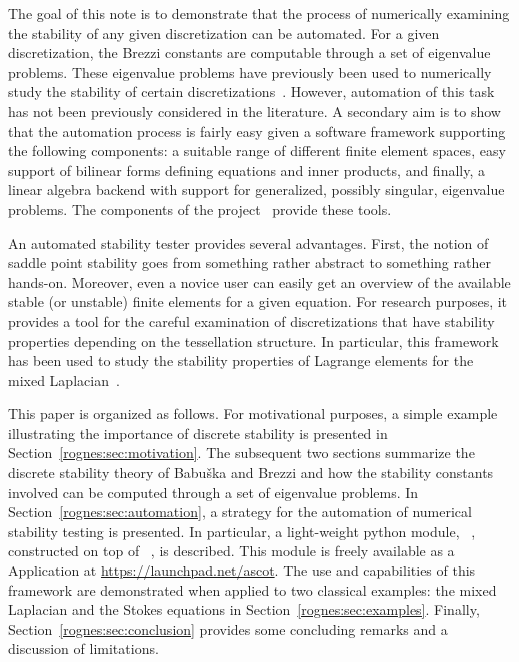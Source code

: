 The goal of this note is to demonstrate that the process of
numerically examining the stability of any given discretization can be
automated. For a given discretization, the Brezzi constants are
computable through a set of eigenvalue problems. These eigenvalue
problems have previously been used to numerically study the stability
of certain discretizations~\cite{ArnoldRognes2009, ChapelleBathe1993,
  Qin1994}. However, automation of this task has not been previously
considered in the literature. A secondary aim is to show that the
automation process is fairly easy given a software framework
supporting the following components: a suitable range of different
finite element spaces, easy support of bilinear forms defining
equations and inner products, and finally, a linear algebra backend
with support for generalized, possibly singular, eigenvalue
problems. The components of the \fenics{} project~\cite{www:fenics}
provide these tools.

An automated stability tester provides several advantages. First, the
notion of saddle point stability goes from something rather abstract
to something rather hands-on. Moreover, even a novice user can easily
get an overview of the available stable (or unstable) finite elements
for a given equation. For research purposes, it provides a tool for
the careful examination of discretizations that have stability
properties depending on the tessellation structure. In particular,
this framework has been used to study the stability properties of
Lagrange elements for the mixed Laplacian~\cite{ArnoldRognes2009}.

This paper is organized as follows. For motivational purposes, a
simple example illustrating the importance of discrete stability is
presented in Section~\ref{rognes:sec:motivation}. The subsequent two
sections summarize the discrete stability theory of Babu\v ska and
Brezzi and how the stability constants involved can be computed
through a set of eigenvalue problems. In
Section~\ref{rognes:sec:automation}, a strategy for the automation of
numerical stability testing is presented. In particular, a
light-weight python module, \rognesascot{}~\cite{www:ascot},
constructed on top of \pydolfin{}~\cite{LoggWells2009}, is
described. This module is freely available as a \fenics{} Application
at \url{https://launchpad.net/ascot}. The use and capabilities of this
framework are demonstrated when applied to two classical examples: the
mixed Laplacian and the Stokes equations in
Section~\ref{rognes:sec:examples}. Finally,
Section~\ref{rognes:sec:conclusion} provides some concluding remarks
and a discussion of limitations.

